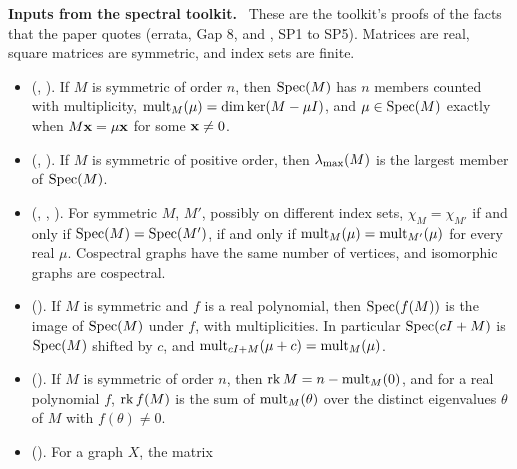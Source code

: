\begingroup\raggedright
\medskip\noindent\textbf{Inputs from the spectral toolkit.}\label{input:st}
\repair\ These are the toolkit's proofs of the facts that the paper quotes (errata, Gap 8, and
, SP1 to SP5). Matrices are real, square matrices are symmetric,
and index sets are finite.
\begin{itemize}
 \item {}
  (,
  ). If $M$ is symmetric of order $n$, then
  $\mathop{\mathrm{Spec}}\nolimits(M)$ has $n$ members counted with multiplicity, $\mathop{\mathrm{mult}}\nolimits_M(\mu)=\dim\ker(M-\mu I)$, and
  $\mu\in\mathop{\mathrm{Spec}}\nolimits(M)$ exactly when $M{\mathbf x}=\mu{\mathbf x}$ for some ${\mathbf x}\ne0$.
 \item {}
  (,
  ). If $M$ is symmetric of positive
  order, then $\lambda_{\max}(M)$ is the largest member of $\mathop{\mathrm{Spec}}\nolimits(M)$.
 \item {}
  (,
  , ).
  For symmetric $M$, $M'$, possibly on different index sets, $\chi_M=\chi_{M'}$ if and only if
  $\mathop{\mathrm{Spec}}\nolimits(M)=\mathop{\mathrm{Spec}}\nolimits(M')$, if and only if $\mathop{\mathrm{mult}}\nolimits_M(\mu)=\mathop{\mathrm{mult}}\nolimits_{M'}(\mu)$ for every real $\mu$.
  Cospectral graphs have the same number of vertices, and isomorphic graphs are cospectral.
 \item {}
  (). If $M$ is symmetric and $f$ is a real
  polynomial, then $\mathop{\mathrm{Spec}}\nolimits(f(M))$ is the image of $\mathop{\mathrm{Spec}}\nolimits(M)$ under $f$, with multiplicities. In
  particular $\mathop{\mathrm{Spec}}\nolimits(cI+M)$ is $\mathop{\mathrm{Spec}}\nolimits(M)$ shifted by $c$, and $\mathop{\mathrm{mult}}\nolimits_{cI+M}(\mu+c)=\mathop{\mathrm{mult}}\nolimits_M(\mu)$.
 \item {}
  (). If $M$ is symmetric of order $n$,
  then $\mathop{\mathrm{rk}}\nolimits M=n-\mathop{\mathrm{mult}}\nolimits_M(0)$, and for a real polynomial $f$, $\mathop{\mathrm{rk}}\nolimits f(M)$ is the sum of
  $\mathop{\mathrm{mult}}\nolimits_M(\theta)$ over the distinct eigenvalues $\theta$ of $M$ with $f(\theta)\ne0$.
 \item {}
  (). For a graph $X$, the matrix

\end{itemize}
